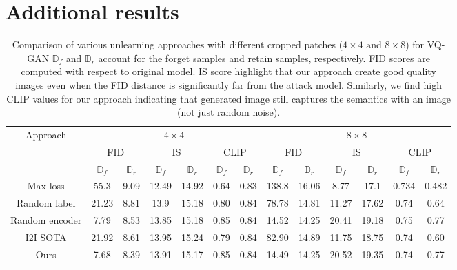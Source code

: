 \maketitlesupplementary
\setcounter{page}{1}
\setcounter{section}{0}
\normalsize
\section{Additional results}
\label{sec:exp_normal_data}
\begin{table*}[h]
    \centering
    \begin{tabular}{ccccccc||cccccc}
      \toprule
      \multirow{3}{*}{Approach} & \multicolumn{6}{c||}{$4\times4$} & \multicolumn{6}{c}{$8\times8$} \\
      & \multicolumn{2}{c}{FID} & \multicolumn{2}{c}{IS} & \multicolumn{2}{c||}{CLIP} & \multicolumn{2}{c}{FID} & \multicolumn{2}{c}{IS} & \multicolumn{2}{c}{CLIP} \\ \cline{2-13}
      & $\mathbb{D}_f$ & $\mathbb{D}_r$ & $\mathbb{D}_f$ & $\mathbb{D}_r$ & $\mathbb{D}_f$ & $\mathbb{D}_r$ & $\mathbb{D}_f$ & $\mathbb{D}_r$ & $\mathbb{D}_f$ & $\mathbb{D}_r$ & $\mathbb{D}_f$ & $\mathbb{D}_r$ \\
      \hline
      Max loss & 55.3 & 9.09 & 12.49 & 14.92 & 0.64 & 0.83 & 138.8 & 16.06 & 8.77 & 17.1 & 0.734 & 0.482 \\
      Random label & 21.23 & 8.81 & 13.9 & 15.18 & 0.80 & 0.84 & 78.78 & 14.81 & 11.27 & 17.62 & 0.74 & 0.64 \\
      Random encoder & 7.79 & 8.53 & 13.85 & 15.18 & 0.85 & 0.84 & 14.52 & 14.25 & 20.41 & 19.18 & 0.75 & 0.77 \\
      I2I SOTA & 21.92 & 8.61 & 13.95 & 15.24 & 0.79 & 0.84 & 82.90 & 14.89 & 11.75 & 18.75 & 0.74 & 0.60 \\
      Ours & 7.68 & 8.39 & 13.91 & 15.17 & 0.85 & 0.84 & 14.49 & 14.25 & 20.52 & 19.35 & 0.74 & 0.77 \\
      \bottomrule
    \end{tabular}
    \caption{Comparison of various unlearning approaches with different cropped patches ($4\times4 \text{ and } 8\times8$) for VQ-GAN $\mathbb{D}_f$ and $\mathbb{D}_r$ account for the forget samples and retain samples, respectively. FID scores are computed with respect to original model. IS score highlight that our approach create good quality images even when the FID distance is significantly far from the attack model. Similarly, we find high CLIP values for our approach indicating that generated image still captures the semantics with an image (not just random noise).}
    \label{tab:VQ-GAN_results_original}
\end{table*}

